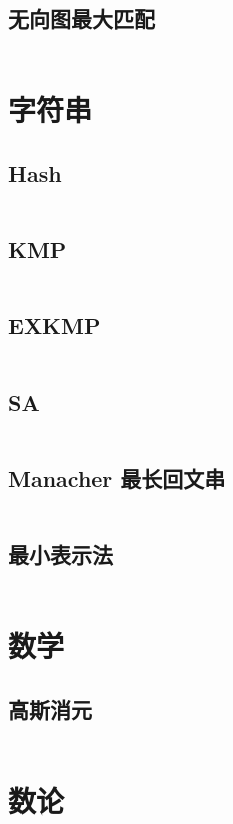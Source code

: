 \documentclass[titlepage,landscape,a4paper,10pt]{article}
\begin{document}
\begin{multicols}{2}
\begin{spacing}{0.8}
\subsection{无向图最大匹配}
\inputminted{cpp}{Graph/无向图最大匹配.cpp}



\section{字符串}

\subsection{Hash}
\inputminted{cpp}{Strings/BKDRHash.cpp}

\subsection{KMP}
\inputminted{cpp}{Strings/KMP.cpp}

\subsection{EXKMP}
\inputminted{cpp}{Strings/EXKMP.cpp}

\subsection{SA}
\inputminted{cpp}{Strings/SA.cpp}

\subsection{Manacher 最长回文串}
\inputminted{cpp}{Strings/Manacher.cpp}

\subsection{最小表示法}
\inputminted{cpp}{Strings/最小表示法.cpp}

\section{数学}

\subsection{高斯消元}
\inputminted{cpp}{Math/高斯消元.cpp}

\section{数论}


\end{spacing}
\end{multicols}
\end{document}
